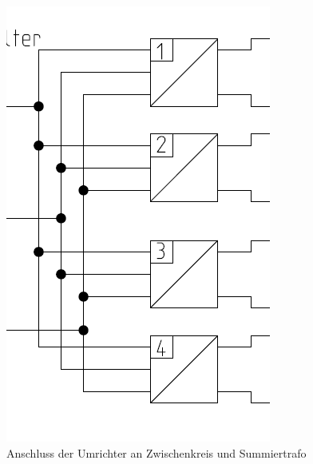 \begin{figure}[!tbp]
\begin{minipage}[b]{0.4\textwidth}
        \includegraphics[width=\textwidth,frame]{Bilder/umrichter_16.png}
      \caption{Anschluss der Umrichter an Zwischenkreis und Summiertrafo}
    \end{minipage}
  \end{figure}


